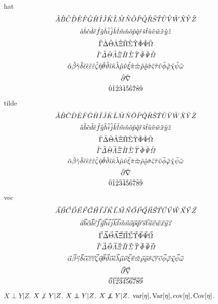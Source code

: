 \documentclass{article}
\begin{document}
hat
\[ \Ah \Bh \Ch \Dh \Eh \Fh \Gh \Hh \Ih \Jh \Kh \Lh \Mh \Nh \Oh \Ph \Qh \Rh \Sh \Th \Uh \Vh \Wh \Xh \Yh \Zh \]
\[ \aah \bbh \cch \ddh \eeh \ffh \ggh \hhh \iih \jjh \kkh \llh \mmh \nnh \ooh \pph \qqh \rrh \ssh \tth \uuh \vvh \wwh \xxh \yyh \zzh \]
\[ \Gammah \Deltah \Thetah \Lambdah \Xih \Pih \Sigmah \Upsilonh \Phih \Psih \Omegah \]
\[ \itGammah \itDeltah \itThetah \itLambdah \itXih \itPih \itSigmah \itUpsilonh \itPhih \itPsih \itOmegah \]
\[ \alphah \betah \gammah \deltah \epsilonh \epsh \varepsilonh \vepsh \zetah \etah \thetah \varthetah \iotah \kappah \lambdah \muh \nuh \xih \pih \varpih \rhoh \varrhoh \sigmah \varsigmah \tauh \upsilonh \phih \varphih \chih \psih \omegah \]
\[ \partialh \nablah \]
\[ \zroh \oneh \twoh \thrh \forh \fivh \sixh \sevh \eith \ninh \]

tilde
\[ \At \Bt \Ct \Dt \Et \Ft \Gt \Ht \It \Jt \Kt \Lt \Mt \Nt \Ot \Pt \Qt \Rt \St \Tt \Ut \Vt \Wt \Xt \Yt \Zt \]
\[ \aat \bbt \cct \ddt \eet \fft \ggt \hht \iit \jjt \kkt \llt \mmt \nnt \oot \ppt \qqt \rrt \sst \ttt \uut \vvt \wwt \xxt \yyt \zzt \]
\[ \Gammat \Deltat \Thetat \Lambdat \Xit \Pit \Sigmat \Upsilont \Phit \Psit \Omegat \]
\[ \itGammat \itDeltat \itThetat \itLambdat \itXit \itPit \itSigmat \itUpsilont \itPhit \itPsit \itOmegat \]
\[ \alphat \betat \gammat \deltat \epsilont \epst \varepsilont \vepst \zetat \etat \thetat \varthetat \iotat \kappat \lambdat \mut \nut \xit \pit \varpit \rhot \varrhot \sigmat \varsigmat \taut \upsilont \phit \varphit \chit \psit \omegat \]
\[ \partialt \nablat \]
\[ \zrot \onet \twot \thrt \fort \fivt \sixt \sevt \eitt \nint \]

vec
\[ \Av \Bv \Cv \Dv \Ev \Fv \Gv \Hv \Iv \Jv \Kv \Lv \Mv \Nv \Ov \Pv \Qv \Rv \Sv \Tv \Uv \Vv \Wv \Xv \Yv \Zv \]
\[ \aav \bbv \ccv \ddv \eev \ffv \ggv \hhv \iiv \jjv \kkv \llv \mmv \nnv \oov \ppv \qqv \rrv \ssv \ttv \uuv \vvv \wwv \xxv \yyv \zzv \]
\[ \Gammav \Deltav \Thetav \Lambdav \Xiv \Piv \Sigmav \Upsilonv \Phiv \Psiv \Omegav \]
\[ \itGammav \itDeltav \itThetav \itLambdav \itXiv \itPiv \itSigmav \itUpsilonv \itPhiv \itPsiv \itOmegav \]
\[ \alphav \betav \gammav \deltav \epsilonv \epsv \varepsilonv \vepsv \zetav \etav \thetav \varthetav \iotav \kappav \lambdav \muv \nuv \xiv \piv \varpiv \rhov \varrhov \sigmav \varsigmav \tauv \upsilonv \phiv \varphiv \chiv \psiv \omegav \]
\[ \partialv \nablav \]
\[ \zrov \onev \twov \thrv \forv \fivv \sixv \sevv \eitv \ninv \]

$X \perp Y | Z$.
$X \notperp Y | Z$.
$X \pperp Y | Z$.
$X \notpperp Y \vert Z$.
$\var[\eta], \Var[\eta], \cov[\eta], \Cov[\eta]$.
\end{document}
